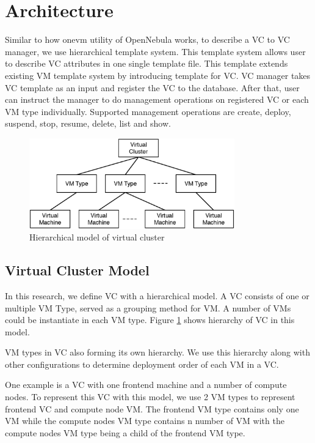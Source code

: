 \documentclass[conference]{IEEEtran}
\begin{document}
\section{Architecture}
Similar to how onevm utility of OpenNebula works, to describe a VC to VC manager, we use hierarchical template system.
This template system allows user to describe VC attributes in one single template file.
This template extends existing VM template system by introducing template for VC.
VC manager takes VC template as an input and register the VC to the database.
After that, user can instruct the manager to do management operations on registered VC or each VM type individually.
Supported management operations are create, deploy, suspend, stop, resume, delete, list and show.

\begin{figure}[!t]
\centering
\includegraphics[width=3.5in]{model}
\caption{Hierarchical model of virtual cluster}
\label{fig:model}
\end{figure}

\subsection{Virtual Cluster Model}
In this research, we define VC with a hierarchical model.
A VC consists of one or multiple VM Type, served as a grouping method for VM.
A number of VMs could be instantiate in each VM type.
Figure \ref{fig:model} shows hierarchy of VC in this model.

VM types in VC also forming its own hierarchy.
We use this hierarchy along with other configurations to determine deployment order of each VM in a VC.

One example is a VC with one frontend machine and a number of compute nodes.
To represent this VC with this model, we use 2 VM types to represent frontend VC and compute node VM.
The frontend VM type contains only one VM while the compute nodes VM type contains n number of VM with the compute nodes VM type being a child of the frontend VM type.
\end{document}
